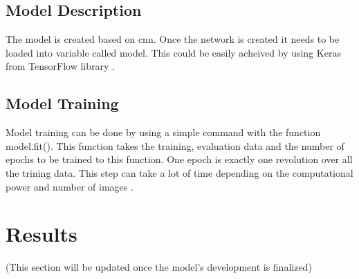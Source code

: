 \subsection{Model Description}
The model is created based on \ac{cnn}. Once the network is created it needs to be loaded into variable called model. This could be easily acheived by using Keras from TensorFlow library \autocite{MakeMedia2021-Part2}.

\subsection{Model Training}
Model training can be done by using a simple command with the function model.fit(). This function takes the training, evaluation data and the number of epochs to be trained to this function. One epoch is exactly one revolution over all the trining data. This step can take a lot of time depending on the computational power and number of images \autocite{MakeMedia2021-Part2}.

\section{Results}
(This section will be updated once the model's development is finalized)







